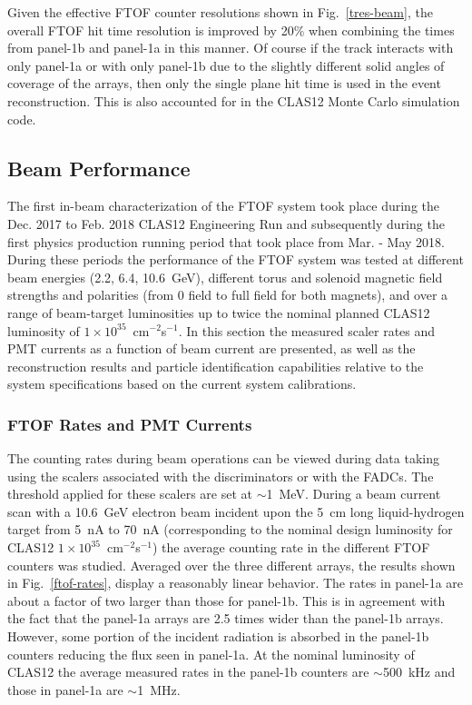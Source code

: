 \documentclass{elsart}
\begin{document}
Given the effective FTOF counter resolutions shown in Fig.~\ref{tres-beam}, the overall FTOF hit
time resolution is improved by 20\% when combining the times from panel-1b and panel-1a in this
manner. Of course if the track interacts with only panel-1a or with only panel-1b due to the slightly
different solid angles of coverage of the arrays, then only the single plane hit time is used in the
event reconstruction. This is also accounted for in the CLAS12 Monte Carlo simulation code.
  
\subsection{Beam Performance}  
\label{sec:beam}

The first in-beam characterization of the FTOF system took place during the Dec. 2017 to Feb. 2018
CLAS12 Engineering Run and subsequently during the first physics production running period that
took place from Mar. - May 2018. During these periods the performance of the FTOF system was
tested at different beam energies (2.2, 6.4, 10.6~GeV), different torus and solenoid magnetic field
strengths and polarities (from 0 field to full field for both magnets), and over a range of beam-target
luminosities up to twice the nominal planned CLAS12 luminosity of $1 \times 10^{35}$~cm$^{-2}$s$^{-1}$.
In this section the measured scaler rates and PMT currents as a function of beam current are presented,
as well as the reconstruction results and particle identification capabilities relative to the system
specifications based on the current system calibrations.

\subsubsection{FTOF Rates and PMT Currents}

The counting rates during beam operations can be viewed during data taking using the scalers associated
with the discriminators or with the FADCs. The threshold applied for these scalers are set at
$\sim$1~MeV. During a beam current scan with a 10.6~GeV electron beam incident upon the 5~cm long
liquid-hydrogen target from 5~nA to 70~nA (corresponding to the nominal design luminosity for CLAS12
$1 \times 10^{35}$~cm$^{-2}$s$^{-1}$) the average counting rate in the different FTOF counters was studied.
Averaged over the three different arrays, the results shown in Fig.~\ref{ftof-rates}, display a reasonably
linear behavior. The rates in panel-1a are about a factor of two larger than those for panel-1b. This is in
agreement with the fact that the panel-1a arrays are 2.5 times wider than the panel-1b arrays. However, some
portion of the incident radiation is absorbed in the panel-1b counters reducing the flux seen in panel-1a. At the
nominal luminosity of CLAS12 the average measured rates in the panel-1b counters are $\sim$500~kHz and
those in panel-1a are $\sim$1~MHz.
\end{document}
